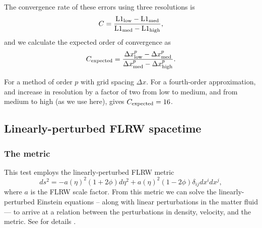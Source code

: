 \documentclass[a4paper]{article}
\begin{document}
The convergence rate of these errors using three resolutions is
\begin{equation}\label{eq:convergence}
	C = \frac{{\rm L1}_{\rm low} - {\rm L1}_{\rm med}}{{\rm L1}_{\rm med} - {\rm L1}_{\rm high}},
\end{equation}
and we calculate the expected order of convergence as
\begin{equation}\label{eq:convergence_expected}
	C_{\rm expected} = \frac{\Delta x_{\rm low}^p - \Delta x_{\rm med}^p}{\Delta x_{\rm med}^p - \Delta x_{\rm high}^p}.
\end{equation}

For a method of order $p$ with grid spacing $\Delta x$. For a fourth-order approximation, and increase in resolution by a factor of two from low to medium, and from medium to high (as we use here), gives $C_{\rm expected}=16$.



\subsection{Linearly-perturbed FLRW spacetime} \label{sec:linpert_test}

\subsubsection{The metric}

This test employs the linearly-perturbed FLRW metric
\begin{equation}\label{eq:lin_metric}
	ds^2 = -a(\eta)^2(1 + 2\phi) d\eta^2 + a(\eta)^2(1 - 2\phi) \delta_{ij}dx^i dx^j,
\end{equation}
where $a$ is the FLRW scale factor. From this metric we can solve the linearly-perturbed Einstein equations -- along with linear perturbations in the matter fluid --- to arrive at a relation between the perturbations in density, velocity, and the metric. See \citet{macpherson2019b} for details \citep[or][for the full derivation]{macpherson2019c}.
\end{document}
